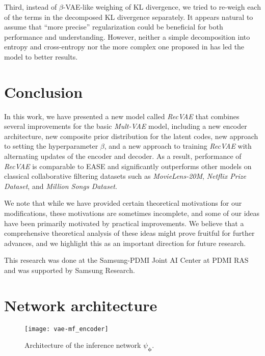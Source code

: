 \documentclass[sigconf,authorversion]{acmart}
\def\bphi{{\boldsymbol{\phi}}}
\begin{document}
Third, instead of $\beta$-VAE-like weighing of KL divergence, we tried to re-weigh each of the terms in the decomposed KL divergence separately. It appears natural to assume that ``more precise'' regularization could be beneficial for both performance and understanding. However, neither a simple decomposition into entropy and cross-entropy nor the more complex one proposed in \cite{chen2018isolating} has led the model to better results.

\section{Conclusion}\label{sec:conclusion}

In this work, we have presented a new model called \emph{RecVAE} that combines several improvements for the basic \emph{Mult-VAE} model, including a new encoder architecture, new composite prior distribution for the latent codes, new approach to setting the hyperparameter $\beta$, and a new approach to training \emph{RecVAE} with alternating updates of the encoder and decoder. As a result, performance of \emph{RecVAE} is comparable to EASE and significantly outperforms other models on classical collaborative filtering datasets such as \emph{MovieLens-20M}, \emph{Netflix Prize Dataset}, and \emph{Million Songs Dataset}.

We note that while we have provided certain theoretical motivations for our modifications, these motivations are sometimes incomplete, and some of our ideas have been primarily motivated by practical improvements. We believe that a comprehensive theoretical analysis of these ideas might prove fruitful for further advances, and we highlight this as an important direction for future research.

\FloatBarrier

\begin{acks}
This research was done at the Samsung-PDMI Joint AI Center at PDMI RAS and was supported by Samsung Research.
\end{acks}




\appendix

\section{Network architecture}

\begin{figure}[h]
  \centering
  \texttt{[image: vae-mf\_encoder]}
  \caption{Architecture of the inference network $\psi_{\bphi}$.}
  \label{fig:encoder}
\end{figure}
\end{document}
